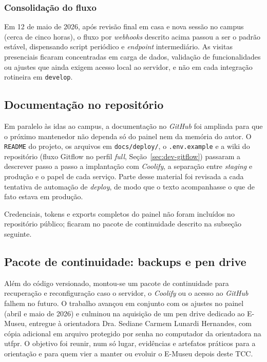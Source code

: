 \subsubsection{Consolidação do fluxo}\label{sec:dev-deploy-automacao-fim}

Em 12 de maio de 2026, após revisão final em casa e nova sessão no campus (cerca de cinco horas), o fluxo por \textit{webhooks} descrito acima passou a ser o padrão estável, dispensando script periódico e \textit{endpoint} intermediário. As visitas presenciais ficaram concentradas em carga de dados, validação de funcionalidades ou ajustes que ainda exigem acesso local ao servidor, e não em cada integração rotineira em \texttt{develop}.


\subsection{Documentação no repositório}\label{sec:dev-deploy-docs}

Em paralelo às idas ao campus, a documentação no \textit{GitHub} foi ampliada para que o próximo mantenedor não dependa só do painel nem da memória do autor. O \texttt{README} do projeto, os arquivos em \texttt{docs/deploy/}, o \texttt{.env.example} e a wiki do repositório (fluxo Gitflow no perfil \textit{full}, Seção~\ref{sec:dev-gitflow}) passaram a descrever passo a passo a implantação com \textit{Coolify}, a separação entre \textit{staging} e produção e o papel de cada serviço. Parte desse material foi revisada a cada tentativa de automação de \textit{deploy}, de modo que o texto acompanhasse o que de fato estava em produção.

Credenciais, tokens e exports completos do painel não foram incluídos no repositório público; ficaram no pacote de continuidade descrito na subseção seguinte.


\subsection{Pacote de continuidade: backups e pen drive}\label{sec:dev-deploy-continuidade}

Além do código versionado, montou-se um pacote de continuidade para recuperação e reconfiguração caso o servidor, o \textit{Coolify} ou o acesso ao \textit{GitHub} falhem no futuro. O trabalho avançou em conjunto com os ajustes no painel (abril e maio de 2026) e culminou na aquisição de um pen drive dedicado ao E-Museu, entregue à orientadora Dra. Sediane Carmem Lunardi Hernandes, com cópia adicional em arquivo protegido por senha no computador da orientadora na \acrshort{utfpr}. O objetivo foi reunir, num só lugar, evidências e artefatos práticos para a orientação e para quem vier a manter ou evoluir o E-Museu depois deste TCC.

